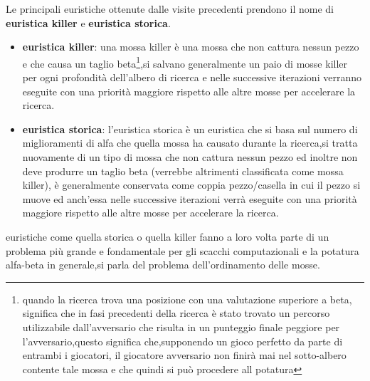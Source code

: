 Le principali euristiche ottenute dalle visite precedenti prendono il nome di \textbf{euristica killer} e \textbf{euristica storica}.
\begin{itemize}
  \item  \textbf{euristica killer}: una mossa killer è una mossa che non cattura nessun pezzo e che causa un taglio beta\footnote{quando la ricerca trova 
  una posizione con una valutazione  superiore a beta, significa che in fasi precedenti della ricerca è stato trovato un percorso utilizzabile 
   dall'avversario che risulta in un punteggio finale peggiore per l'avversario,questo significa che,supponendo un gioco
   perfetto da parte di entrambi i giocatori, il giocatore avversario non finirà mai nel sotto-albero contente tale mossa e che quindi si 
   può procedere all potatura},si salvano generalmente un paio di mosse killer per ogni profondità dell'albero di ricerca e nelle successive iterazioni
   verranno eseguite con una priorità maggiore rispetto alle altre mosse per accelerare la ricerca. 
  \item \textbf{euristica storica}: l'euristica storica è un euristica che si basa sul numero di miglioramenti di alfa che quella mossa ha causato
   durante la ricerca,si tratta nuovamente di un tipo di mossa che non cattura nessun pezzo ed inoltre non deve produrre un taglio beta
  (verrebbe altrimenti classificata come mossa killer), è generalmente conservata come coppia pezzo/casella in cui il pezzo si muove 
  ed anch'essa  nelle successive iterazioni verrà eseguite con una priorità maggiore rispetto alle altre mosse per accelerare la ricerca. 
\end{itemize} 
euristiche come quella storica o quella killer fanno a loro volta parte di un problema più grande e fondamentale per gli scacchi computazionali 
e la potatura alfa-beta in generale,si parla del problema dell'ordinamento delle mosse.

